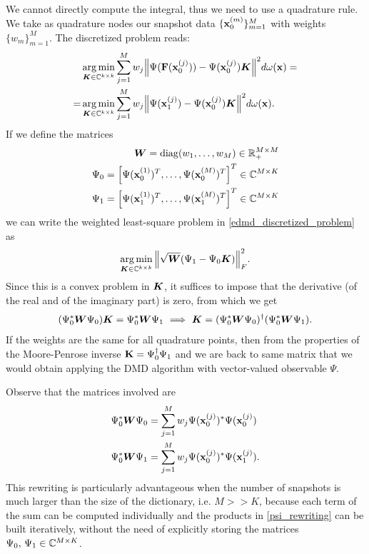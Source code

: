 We cannot directly compute the integral, thus we need to use a quadrature rule. We take as quadrature nodes our snapshot data $\{\vb{x}_0^{(m)}\}_{m = 1}^M$ with weights $\{w_m\}_{m = 1}^M$. The discretized problem reads:
\begin{equation}
\label{edmd_discretized_problem}
\begin{split}
    &\operatorname*{arg\,min}_{\vb*{K}\in\mathbb{C}^{k\times k}} \sum_{j=1}^M w_j \norm{\Psi(\vb{F}(\vb{x}_0^{(j)})) - \Psi(\vb{x}_0^{(j)})\vb*{K}}^2 d\omega(\vb{x}) = \\
    = &\operatorname*{arg\,min}_{\vb*{K}\in\mathbb{C}^{k\times k}} \sum_{j=1}^M w_j \norm{\Psi(\vb{x}_1^{(j)}) - \Psi(\vb{x}_0^{(j)})\vb*{K}}^2 d\omega(\vb{x}).
\end{split}    
\end{equation}
If we define the matrices
\begin{align}
\label{w_def}
\vb*{W} = \mathrm{diag}(w_1,\dots,w_M)\in\mathbb{R}_+^{M\times M} \\
\label{psi0_def}
\Psi_0 = \left[\Psi(\vb{x}_0^{(1)})^T,\dots,\Psi(\vb{x}_0^{(M)})^T\right]^T\in\mathbb{C}^{M\times K} \\
\label{psi1_def}
\Psi_1 = \left[\Psi(\vb{x}_1^{(1)})^T,\dots,\Psi(\vb{x}_1^{(M)})^T\right]^T\in\mathbb{C}^{M\times K}
\end{align}
we can write the weighted least-square problem in \eqref{edmd_discretized_problem} as 
\begin{equation}
    \label{edmd_discretized_problem_matrix}
    \operatorname*{arg\,min}_{\vb*{K}\in\mathbb{C}^{k\times k}}\norm{\sqrt{\vb*{W}}(\Psi_1 - \Psi_0\vb*{K})}_F^2.
\end{equation}
Since this is a convex problem in $\vb*{K}$, it suffices to impose that the derivative (of the real and of the imaginary part) is zero, from which we get
\begin{equation}
    \label{discretized_problem_solution}
    (\Psi_0^*\vb*{W}\Psi_0)\vb*{K} = \Psi_0^*\vb*{W}\Psi_1 \,\,\Longrightarrow\,\, \vb*{K} = (\Psi_0^*\vb*{W}\Psi_0)^{\dagger}(\Psi_0^*\vb*{W}\Psi_1).
\end{equation}
If the weights are the same for all quadrature points, then from the properties of the Moore-Penrose inverse $\vb{K} = \Psi_0^{\dagger} \Psi_1$ and we are back to same matrix that we would obtain applying the DMD algorithm with vector-valued observable $\Psi$.

Observe that the matrices involved are
\begin{equation*}
    \label{psi_rewriting}
    \begin{split}
        \Psi_0^*\vb*{W}\Psi_0 & = \sum_{j=1}^M w_j \Psi(\vb{x}_0^{(j)})^* \Psi(\vb{x}_0^{(j)})\\
        \Psi_0^*\vb*{W}\Psi_1 & = \sum_{j=1}^M w_j \Psi(\vb{x}_0^{(j)})^* \Psi(\vb{x}_1^{(j)}).
    \end{split}
\end{equation*}
This rewriting is particularly advantageous when the number of snapshots is much larger than the size of the dictionary, i.e. $M >> K$, because each term of the sum can be computed individually and the products in \eqref{psi_rewriting} can be built iteratively, without the need of explicitly storing the matrices $\Psi_0,\,\Psi_1\in\mathbb{C}^{M\times K}$.

